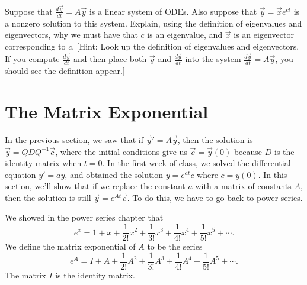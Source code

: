 \begin{problem}
Suppose that $\frac{d\vec y}{dt} = A\vec y$ is a linear system of ODEs.  Also suppose that $\vec y=\vec x e^{ct}$ is a nonzero solution to this system. Explain, using the definition of eigenvalues and eigenvectors, why we must have that $c$ is an eigenvalue, and $\vec x$ is an eigenvector corresponding to $c$. [Hint:  Look up the definition of eigenvalues and eigenvectors.  If you compute $\frac{d\vec y}{dt}$ and then place both $\vec y$ and $\frac{d\vec y}{dt}$ into the system $\frac{d\vec y}{dt}= A\vec y$, you should see the definition appear.] 
\end{problem}


\section{The Matrix Exponential}
In the previous section, we saw that if $\vec y' = A\vec y$, then the solution is $\vec y = QDQ^{-1}\vec c$, where the initial conditions give us $\vec c = \vec y(0)$ because $D$ is the identity matrix when $t=0$.  In the first week of class, we solved the differential equation $y'=ay$, and obtained the solution $y=e^{at}c$ where $c=y(0)$.  In this section, we'll show that if we replace the constant $a$ with a matrix of constants $A$, then the solution is still $\vec y=e^{At}\vec c$. To do this, we have to go back to power series. 

\begin{definition}
 We showed in the power series chapter that 
$$e^x = 1+x+\frac{1}{2!}x^2+\frac{1}{3!}x^3+\frac{1}{4!}x^4+\frac{1}{5!}x^5+\cdots.$$
We define the matrix exponential of $A$ to be the series
$$e^A = I+A+\frac{1}{2!}A^2+\frac{1}{3!}A^3+\frac{1}{4!}A^4+\frac{1}{5!}A^5+\cdots.$$
The matrix $I$ is the identity matrix.
\end{definition}


